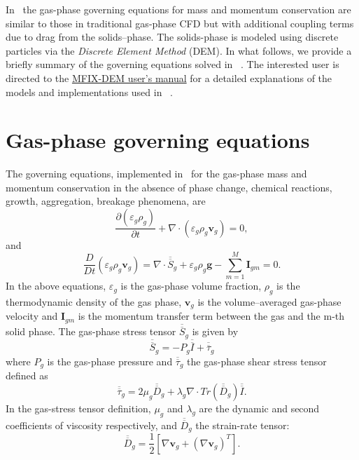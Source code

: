 In \mfix\ the gas-phase governing equations for mass and momentum
conservation are similar to those in traditional gas-phase CFD
but with additional coupling terms due to drag from the solids–phase.
The solids-phase is modeled using discrete particles via the
\emph{Discrete Element Method} (DEM). In what follows, we provide
a briefly summary of the governing equations solved in \mfix\ .
The interested user is directed to the 
\href{https://mfix.netl.doe.gov/download/mfix/mfix_current_documentation/dem_doc_2012-1.pdf}{MFIX-DEM user's manual}
for a detailed explanations of the models and implementations used in
\mfix\ .

\section{Gas-phase governing equations}
The governing equations, implemented in \mfix\ for the gas-phase mass
and momentum conservation in the absence of phase change, chemical
reactions, growth, aggregation, breakage phenomena, are
\begin{equation}
  \dfrac{\partial (\varepsilon_g\rho_g) }{\partial t} +\nabla\cdot(\varepsilon_g\rho_g\boldsymbol v_g) = 0,
\end{equation}
and 
\begin{equation}
  \dfrac{D}{D t}(\varepsilon_g\rho_g\boldsymbol v_g) =
  \nabla\cdot \overline{\overline{S}}_g + \varepsilon_g\rho_g\boldsymbol g - \sum\limits_{m=1}^M \boldsymbol I _{gm} = 0.
\end{equation}
In the above equations, $\varepsilon_g$ is the gas-phase volume
fraction, $\rho_g$ is the thermodynamic density of
the gas phase, $\boldsymbol v_g$ is the volume–averaged gas-phase
velocity and  $\boldsymbol I_{gm}$ is the momentum transfer term
between the gas and the m-th solid phase. The gas-phase stress tensor 
$\overline{\overline{S}}_g$ is given by
\begin{equation}
  \overline{\overline{S}}_g = -P_g  \overline{\overline{I}} +  \overline{\overline{\tau}}_g
\end{equation}
where $P_g$ is the gas-phase pressure and $\overline{\overline{\tau}}_g$ the gas-phase shear
stress tensor defined as
\begin{equation}
  \overline{\overline{\tau}}_g = 2\mu_g \overline{\overline{D}}_g  +\lambda_g \nabla\cdot Tr(\overline{\overline{D}}_g )
  \overline{\overline{I}}.
\end{equation}
In the gas-stress tensor definition, $\mu_g$ and $\lambda_g$ are the dynamic
and second coefficients of viscosity respectively, and
$\overline{\overline{D}}_g$ the strain-rate tensor:
\begin{equation}
  \overline{\overline{D}}_g = \dfrac{1}{2}\left[\nabla\boldsymbol v_g + (\nabla\boldsymbol v_g)^T\right].
\end{equation}
